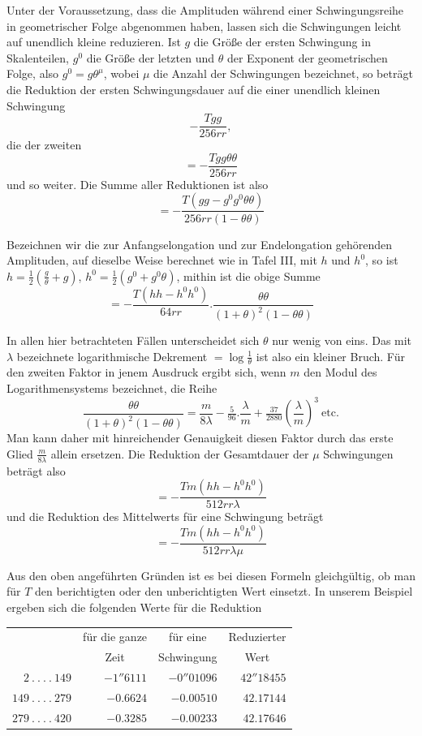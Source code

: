 Unter der Voraussetzung, dass die Amplituden während einer Schwingungsreihe in geometrischer Folge abgenommen haben, lassen sich die Schwingungen leicht auf unendlich kleine reduzieren. Ist $g$ die Größe der ersten Schwingung in Skalenteilen, $g^0$ die Größe der letzten und $\theta$ der Exponent der geometrischen Folge, also $g^0=g\theta^\mu$, wobei $\mu$ die Anzahl der Schwingungen bezeichnet, so beträgt die Reduktion der ersten Schwingungsdauer auf die einer unendlich kleinen Schwingung
\[
-\frac{Tgg}{256rr},
\]
die der zweiten
\[
=-\frac{Tgg\theta\theta}{256rr}
\]
und so weiter. Die Summe aller Reduktionen ist also
\[
=-\frac{T(gg-g^0g^0\theta\theta)}{256rr(1-\theta\theta)}
\]

Bezeichnen wir die zur Anfangselongation und zur Endelongation gehörenden Amplituden, auf dieselbe Weise berechnet wie in Tafel III, mit $h$ und $h^0$, so ist $h=\tfrac12(\frac{g}{\theta}+g)$, $h^0=\tfrac12(g^0+g^0\theta)$, mithin ist die obige Summe
\[
=-\frac{T(hh-h^0h^0)}{64rr}.\frac{\theta\theta}{(1+\theta)^2(1-\theta\theta)}
\]

In allen hier betrachteten Fällen unterscheidet sich $\theta$ nur wenig von eins. Das mit $\lambda$ bezeichnete logarithmische Dekrement $=\log\frac1\theta$ ist also ein kleiner Bruch. Für den zweiten Faktor in jenem Ausdruck ergibt sich, wenn $m$ den Modul des Logarithmensystems bezeichnet, die Reihe
\[
\frac{\theta\theta}{(1+\theta)^2(1-\theta\theta)}=\frac{m}{8\lambda}-\tfrac5{96}.\frac{\lambda}{m}+\tfrac{37}{2880}(\frac{\lambda}{m})^3\ \text{etc.}
\]
Man kann daher mit hinreichender Genauigkeit diesen Faktor durch das erste Glied $\frac{m}{8\lambda}$ allein ersetzen. Die Reduktion der Gesamtdauer der $\mu$ Schwingungen beträgt also
\[
=-\frac{Tm(hh-h^0h^0)}{512rr\lambda}
\]
und die Reduktion des Mittelwerts für eine Schwingung beträgt
\[
=-\frac{Tm(hh-h^0h^0)}{512rr\lambda\mu}
\]

Aus den oben angeführten Gründen ist es bei diesen Formeln gleichgültig, ob man für $T$ den berichtigten oder den unberichtigten Wert einsetzt. In unserem Beispiel ergeben sich die folgenden Werte für die Reduktion
\begin{center}
\fontsize{9}{11}\selectfont
\begin{tabular}{r|r|r|r}
& \multicolumn{1}{c|}{für die ganze} & \multicolumn{1}{c|}{für eine} & \multicolumn{1}{c}{Reduzierter}\\
& \multicolumn{1}{c|}{Zeit} & \multicolumn{1}{c|}{Schwingung} & \multicolumn{1}{c}{Wert}\\[5pt]
$2\ .\ .\ .\ .\ 149$ & $-1''6111$ & $-0''01096$ & $42''18455$\\
$149\ .\ .\ .\ .\ 279$ & $-0.6624$ & $-0.00510$ & $42.17144$\\
$279\ .\ .\ .\ .\ 420$ & $-0.3285$ & $-0.00233$ & $42.17646$
\end{tabular}
\end{center}

